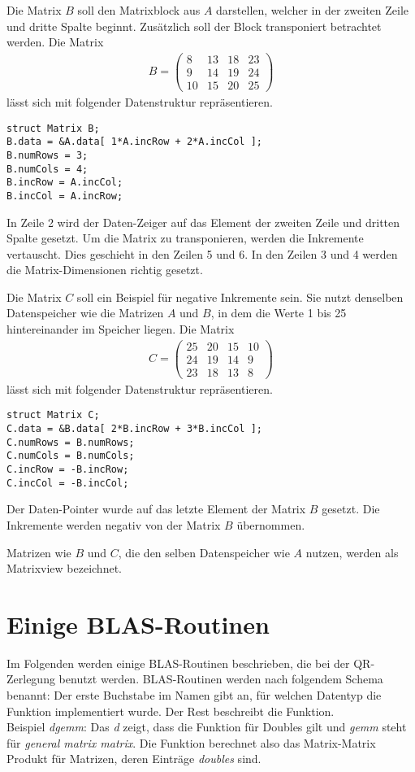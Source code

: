 Die Matrix $B$ soll den Matrixblock aus $A$ darstellen, welcher in der zweiten Zeile und dritte Spalte beginnt. Zusätzlich soll der Block transponiert betrachtet werden. Die Matrix
\begin{align*}
B = \begin{pmatrix}
8 &  13 &  18 & 23 \\
9 &  14 &  19 & 24 \\
10 &  15 &  20 & 25 
\end{pmatrix}
\end{align*}
lässt sich mit folgender Datenstruktur repräsentieren.
\begin{lstlisting}
struct Matrix B;
B.data = &A.data[ 1*A.incRow + 2*A.incCol ];
B.numRows = 3; 
B.numCols = 4;
B.incRow = A.incCol;
B.incCol = A.incRow;
\end{lstlisting}

In Zeile 2 wird der Daten-Zeiger auf das Element der zweiten Zeile und dritten Spalte gesetzt.
Um die Matrix zu transponieren, werden die Inkremente vertauscht. Dies geschieht in den Zeilen 5 und 6.  
In den Zeilen 3 und 4 werden die Matrix-Dimensionen richtig gesetzt.

Die Matrix $C$ soll ein Beispiel für negative Inkremente sein. Sie nutzt denselben Datenspeicher wie die Matrizen $A$ und $B$, in dem die Werte 1 bis 25 hintereinander im Speicher liegen.
Die Matrix 
\begin{align*}
C = \begin{pmatrix}
25 &  20 &  15 & 10 \\
24 &  19 &  14 & 9 \\
23 &  18 &  13 & 8 
\end{pmatrix}
\end{align*}
lässt sich mit folgender Datenstruktur repräsentieren.
\begin{lstlisting}
struct Matrix C;
C.data = &B.data[ 2*B.incRow + 3*B.incCol ];
C.numRows = B.numRows; 
C.numCols = B.numCols;
C.incRow = -B.incRow;
C.incCol = -B.incCol;
\end{lstlisting}
Der Daten-Pointer wurde auf das letzte Element der Matrix $B$ gesetzt. Die Inkremente werden negativ von der Matrix $B$ übernommen.

Matrizen wie $B$ und $C$, die den selben Datenspeicher wie $A$ nutzen, werden als Matrixview bezeichnet. \cite{blast}


\newpage
\section{Einige BLAS-Routinen}
Im Folgenden werden einige BLAS-Routinen beschrieben, die bei der QR-Zerlegung benutzt werden.
BLAS-Routinen werden nach folgendem Schema benannt:
Der erste Buchstabe im Namen gibt an, für welchen Datentyp die Funktion implementiert wurde. Der Rest beschreibt die Funktion.\\
Beispiel \textit{dgemm}: Das \textit{d} zeigt, dass die Funktion für Doubles gilt und  \textit{gemm} steht für \textit{general matrix matrix}. Die  Funktion berechnet also das Matrix-Matrix Produkt für Matrizen, deren Einträge \textit{doubles} sind.

